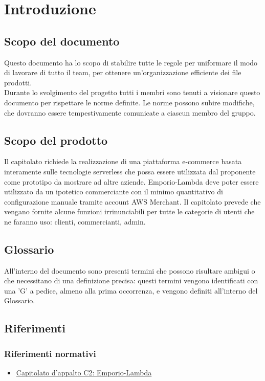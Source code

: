 \section{Introduzione}
    \subsection{Scopo del documento}
    Questo documento ha lo scopo di stabilire tutte le regole per uniformare il modo di lavorare di tutto il team, per ottenere un'organizzazione efficiente dei file prodotti. \\Durante lo svolgimento del progetto tutti i membri sono tenuti a visionare questo documento per rispettare le norme definite.
    Le norme possono subire modifiche, che dovranno essere tempestivamente comunicate a ciascun membro del gruppo.

    \subsection{Scopo del prodotto}
    Il capitolato richiede la realizzazione di una piattaforma e-commerce basata interamente sulle tecnologie serverless che possa essere utilizzata dal proponente come prototipo da mostrare ad altre aziende. Emporio-Lambda deve poter essere utilizzato da un ipotetico commerciante con il minimo quantitativo di configurazione manuale tramite account AWS Merchant. Il capitolato prevede che vengano fornite alcune funzioni irrinunciabili per tutte le categorie di utenti che ne faranno uso: clienti, commercianti, admin.
    \subsection{Glossario}
    All'interno del documento sono presenti termini che possono risultare ambigui o che necessitano di una definizione precisa: questi termini vengono identificati con una 'G' a pedice, almeno alla prima occorrenza, e vengono definiti all'interno del Glossario.
    \subsection{Riferimenti}
        \subsubsection{Riferimenti normativi}
        \begin{itemize}
            \item \href{https://www.math.unipd.it/~tullio/IS-1/2020/Progetto/C2.pdf}{Capitolato d'appalto C2: Emporio-Lambda}
        \end{itemize}

